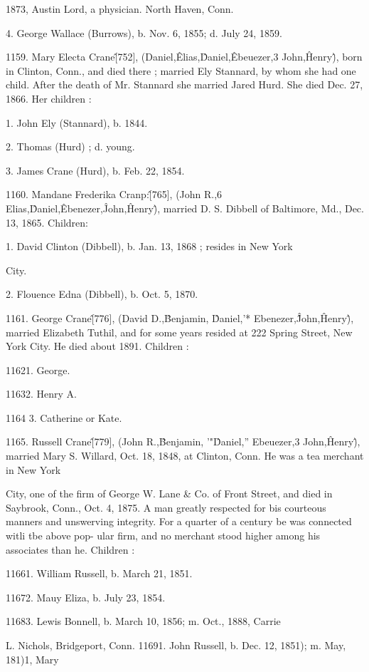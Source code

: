 \documentclass{book}
\begin{document}
1873, Austin Lord, a physician. North Haven, Conn. 

4. George Wallace (Burrows), b. Nov. 6, 1855; d. July 24, 1859. 

1159. Mary Electa Crane\^ [752], (Daniel,\^ Elias,\^ Daniel,\^ 
Ebeuezer,3 John,\^ Henry\^), born in Clinton, Conn., and died 
there ; married Ely Stannard, by whom she had one child. After 
the death of Mr. Stannard she married Jared Hurd. She died 
Dec. 27, 1866. Her children : 

1. John Ely (Stannard), b. 1844. 

2. Thomas (Hurd) ; d. young. 

3. James Crane (Hurd), b. Feb. 22, 1854. 

1160. Mandane Frederika Cranp:\^ [765], (John R.,6 Elias,\^ 
Daniel,\^ Ebenezer,\^ John,\^ Henry\^), married D. S. Dibbell of 
Baltimore, Md., Dec. 13, 1865. Children: 

1. David Clinton (Dibbell), b. Jan. 13, 1868 ; resides in New York 

City. 

2. Flouence Edna (Dibbell), b. Oct. 5, 1870. 

1161. George Crane\^ [776], (David D.,\^ Benjamin, \^ Daniel,'* 
Ebenezer,\^\^ John,\^ Henry\^), married Elizabeth Tuthil, and for 
some years resided at 222 Spring Street, New York City. He 
died about 1891. Children : 

11621. George. 

11632. Henry A. 

1164  3. Catherine or Kate. 

1165. Russell Crane\^ [779], (John R.,\^ Benjamin, '"\^ Daniel,'' 
Ebeuezer,3 John,\^ Henry\^), married Mary S. Willard, Oct. 18, 
1848, at Clinton, Conn. He was a tea merchant in New York 




City, one of the firm of George W. Lane \& Co. of Front Street, 
and died in Saybrook, Conn., Oct. 4, 1875. A man greatly 
respected for bis courteous manners and unswerving integrity. 
For a quarter of a century be was connected witli tbe above pop- 
ular firm, and no merchant stood higher among his associates 
than he. Children : 

11661. William Russell, b. March 21, 1851. 

11672. Mauy Eliza, b. July 23, 1854. 

11683. Lewis Bonnell, b. March 10, 1856; m. Oct., 1888, Carrie 

L. Nichols, Bridgeport, Conn. 
11691. John Russell, b. Dec. 12, 1851); m. May, 181)1, Mary 
\end{document}
